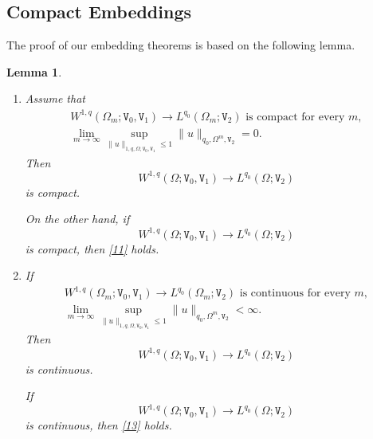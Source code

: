 \documentclass[reqno, 11pt, a4paper]{amsart}
\newtheorem{lemma}[theorem]{Lemma}
\numberwithin{equation}{section}
\newcommand{\wghtv}{\mathtt{V}}
\newcommand{\qxp}{q}
\begin{document}
\subsection{Compact Embeddings}

The proof of our embedding theorems is based on the following lemma.
\begin{lemma} \label{21}
$ $
\begin{enumerate}[label=(\roman*)]
\item \label{18} Assume that
\begin{gather}
W^{1,\qxp}(\Omega_m;\wghtv_0,\wghtv_1)\rightarrow L^{\qxp_0}(\Omega_m;\wghtv_2) \text { is compact for every }m,\label{10}\\[3pt]
\lim_{m\rightarrow\infty}\sup_{\|u\|_{1,\qxp,\Omega,\wghtv_0,\wghtv_1}\leq1}\|u\|_{\qxp_0,\Omega^m,\wghtv_2}=0.\label{11}
\end{gather}
Then
$$
W^{1,\qxp}(\Omega;\wghtv_0,\wghtv_1)\rightarrow L^{\qxp_0}(\Omega;\wghtv_2)
$$
is compact.

On the other hand, if
$$
W^{1,\qxp}(\Omega;\wghtv_0,\wghtv_1)\rightarrow L^{\qxp_0}(\Omega;\wghtv_2)
$$
is compact, then \eqref{11} holds.

\item \label{19} If
\begin{gather}
W^{1,\qxp}(\Omega_m;\wghtv_0,\wghtv_1)\rightarrow L^{\qxp_0}(\Omega_m;\wghtv_2) \text { is continuous for every }m,\label{12}\\[5pt]
\lim_{m\rightarrow\infty}\sup_{\|u\|_{1,\qxp,\Omega,\wghtv_0,\wghtv_1}\leq1}\|u\|_{\qxp_0,\Omega^m,\wghtv_2}<\infty.\label{13}
\end{gather}
Then
$$
W^{1,\qxp}(\Omega;\wghtv_0,\wghtv_1)\rightarrow L^{\qxp_0}(\Omega;\wghtv_2)
$$
is continuous.

If
$$
W^{1,\qxp}(\Omega;\wghtv_0,\wghtv_1)\rightarrow L^{\qxp_0}(\Omega;\wghtv_2)
$$
is continuous, then \eqref{13} holds.
\end{enumerate}
\end{lemma}
\end{document}
